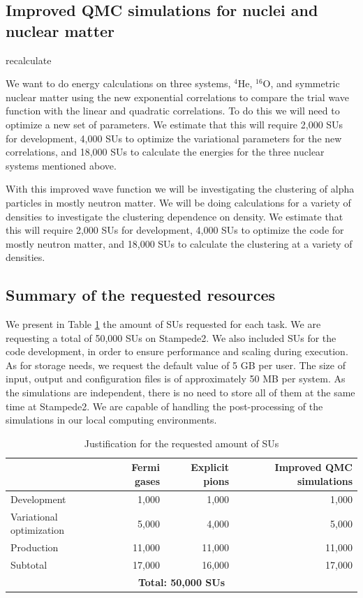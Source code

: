\documentclass[12pt,letterpaper]{article}
\begin{document}
\subsection{Improved QMC simulations for nuclei and nuclear matter}

{\color{red} recalculate}

We want to do energy calculations on three systems, $^4$He, $^{16}$O, and
symmetric nuclear matter using the new exponential correlations to compare the
trial wave function with the linear and quadratic correlations. To do this we
will need to optimize a new set of parameters. We estimate that this will
require 2,000 SUs for development, 4,000 SUs to optimize the variational
parameters for the new correlations, and 18,000 SUs to calculate the energies
for the three nuclear systems mentioned above.

With this improved wave function we will be investigating the clustering of
alpha particles in mostly neutron matter. We will be doing calculations for a
variety of densities to investigate the clustering dependence on density. We
estimate that this will require 2,000 SUs for development, 4,000 SUs to
optimize the code for mostly neutron matter, and 18,000 SUs to calculate the
clustering at a variety of densities.

\subsection{Summary of the requested resources}

We present in Table \ref{tab:SUs} the amount of SUs requested for each task.
We are requesting a total of 50,000 SUs on Stampede2.
We also included SUs for the code 
development, in order to ensure performance and scaling during execution.
As for storage needs, we request the default value of 5 GB per user. The size 
of input, 
output and configuration files is of approximately 50 MB per system. As the 
simulations are independent, there is no need to store all of them at the 
same time at Stampede2. We are capable of handling the post-processing of the 
simulations in our local computing environments.

\begin{table}[htbp]
\caption{Justification for the requested amount of SUs}
\begin{tabular}{|l|r|r|r|}
\hline
 & \textbf{Fermi gases} & \textbf{Explicit pions} & \textbf{Improved QMC simulations} \\ \hline
Development 			 & 1,000 & 1,000 & 1,000 \\ \hline
Variational optimization & 5,000 & 4,000 & 5,000 \\ \hline
Production 				 &11,000 & 11,000 & 11,000 \\ \hline
Subtotal 				& 17,000 & 16,000 & 17,000 \\ \hline\hline
\multicolumn{4}{|c|}{\textbf{Total: 50,000 SUs}} \\ \hline
\end{tabular}
\label{tab:SUs}
\end{table}
\end{document}
